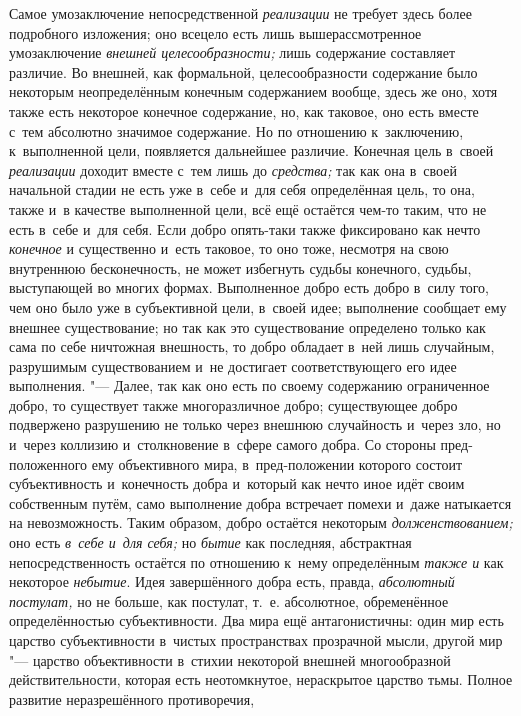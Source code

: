 Самое умозаключение непосредственной
{\em реализации} не
требует здесь более подробного изложения; оно всецело есть лишь
вышерассмотренное умозаключение
{\em внешней целесообразности;}
лишь содержание составляет различие. Во внешней, как
формальной, целесообразности содержание было некоторым неопределённым
конечным содержанием вообще, здесь же оно, хотя также есть некоторое
конечное содержание, но, как таковое, оно есть вместе с~тем абсолютно
значимое содержание. Но по отношению к~заключению, к~выполненной цели,
появляется дальнейшее различие. Конечная цель в~своей
{\em реализации} доходит
вместе с~тем лишь до {\em средства;}
так как она в~своей начальной стадии не есть уже в~себе и~для
себя определённая цель, то она, также и~в качестве выполненной цели, всё
ещё остаётся чем-то таким, что не есть в~себе и~для себя. Если добро
опять-таки также фиксировано как нечто
{\em конечное} и
существенно и~есть таковое, то оно тоже, несмотря на свою внутреннюю
бесконечность, не может избегнуть судьбы конечного, судьбы, выступающей во
многих формах. Выполненное добро есть добро в~силу того, чем оно было уже в
субъективной цели, в~своей идее; выполнение сообщает ему внешнее
существование; но так как это существование определено только как сама по
себе ничтожная внешность, то добро обладает в~ней лишь случайным,
разрушимым существованием и~не достигает соответствующего его идее
выполнения. "--- Далее, так как оно есть по своему содержанию
ограниченное добро, то существует также многоразличное добро; существующее
добро подвержено разрушению не только через внешнюю случайность и~через
зло, но и~через коллизию и~столкновение в~сфере самого добра. Со стороны
пред-положенного ему объективного мира, в~пред-положении которого состоит
субъективность и~конечность добра и~который как нечто иное идёт своим
собственным путём, само выполнение добра встречает помехи и~даже натыкается
на невозможность. Таким образом, добро остаётся некоторым
{\em долженствованием;}
оно есть {\em в~себе и~для
себя;} но {\em бытие}
как последняя, абстрактная непосредственность остаётся по
отношению к~нему определённым {\em также
и} как некоторое
{\em небытие}. Идея
завершённого добра есть, правда,
{\em абсолютный постулат,}
но не больше, как постулат, т.~е. абсолютное, обременённое
определённостью субъективности. Два мира ещё антагонистичны: один мир есть
царство субъективности в~чистых пространствах прозрачной мысли, другой мир
"--- царство объективности в~стихии некоторой внешней
многообразной действительности, которая есть неотомкнутое, нераскрытое
царство тьмы. Полное развитие неразрешённого противоречия,
